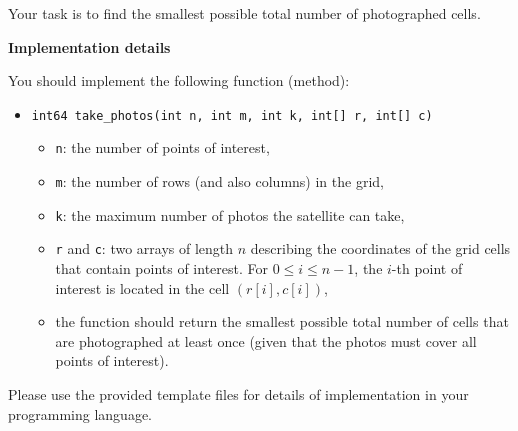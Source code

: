 Your task is to find the smallest possible total number of photographed cells.

\textbf{Implementation details}

You should implement the following function (method): 

\begin{itemize}
\item \texttt{int64 take\_photos(int n, int m, int k, int[] r, int[] c)}
\begin{itemize}
  \item \texttt{n}: the number of points of interest,
  \item \texttt{m}: the number of rows (and also columns) in the grid,
  \item \texttt{k}: the maximum number of photos the satellite can take,
  \item \texttt{r} and \texttt{c}: two arrays of length $n$ describing the coordinates
  of the grid cells that contain points of interest. 
  For $0 \le i \le n - 1$, the $i$-th point of interest is
  located in the cell $(r[i], c[i])$,
  \item the function should return the smallest possible total number of
  cells that are photographed at least once (given that the photos must cover
  all points of interest).
\end{itemize}
\end{itemize}

Please use the provided template files for details of implementation in your 
programming language.
